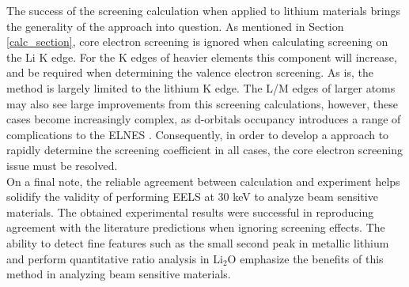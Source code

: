The success of the screening calculation when applied to lithium materials brings the generality of the approach into question.  As mentioned in Section \ref{calc_section}, core electron screening is ignored when calculating screening on the Li K edge.  For the K edges of heavier elements this component will increase, and be required when determining the valence electron screening.  As is, the method is largely limited to the lithium K edge.  The L/M edges of larger atoms may also see large improvements from this screening calculations, however, these cases become increasingly complex, as d-orbitals occupancy introduces a range of complications to the ELNES \cite{hubbard_electron_1963}. Consequently, in order to develop a approach to rapidly determine the screening coefficient in all cases, the core electron screening issue must be resolved.  \\


On a  final note, the reliable agreement between calculation and experiment helps solidify the validity of performing EELS at 30 keV to analyze beam sensitive materials.  The obtained experimental results were successful in reproducing agreement with the literature predictions when ignoring screening effects.  The ability to detect fine features such as the small second peak in metallic lithium and perform quantitative ratio analysis in $ \mathrm{Li_2O} $ emphasize the benefits of this method in analyzing beam sensitive materials.  \\








